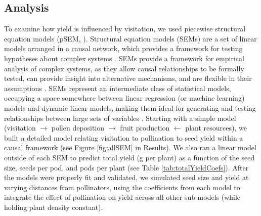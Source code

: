 \documentclass[12pt]{article} %
\begin{document}
\subsection*{Analysis}
To examine how yield is influenced by visitation, we used piecewise structural equation models (pSEM, \citealp{shipley2009}).
Structural equation models (SEMs) are a set of linear models arranged in a causal network, which provides a framework for testing hypotheses about complex systems \citep{grace2012, lefcheck2015}.
SEMs provide a framework for empirical analysis of complex systems, as they allow causal relationships to be formally tested, can provide insight into alternative mechanisms, and are flexible in their assumptions \citep{shipley2009,clough2012, grace2012}.
SEMs represent an intermediate class of statistical models, occupying a space somewhere between linear regression (or machine learning) models and dynamic linear models, making them ideal for generating and testing relationships between large sets of variables \citep{grace2006, kline2013}. 
Starting with a simple model (visitation $\rightarrow$ pollen deposition $\rightarrow$ fruit production $\leftarrow$ plant resources), we built a detailed model relating visitation to pollination to seed yield within a causal framework (see Figure \ref{fig:allSEM} in Results).
We also ran a linear model outside of each SEM to predict total yield (g per plant) as a function of the seed size, seeds per pod, and pods per plant (see Table \ref{tab:totalYieldCoefs}).
After the models were properly fit and validated, we simulated seed size and yield at varying distances from pollinators, using the coefficients from each model to integrate the effect of pollination on yield across all other sub-models (while holding plant density constant).
\end{document}
